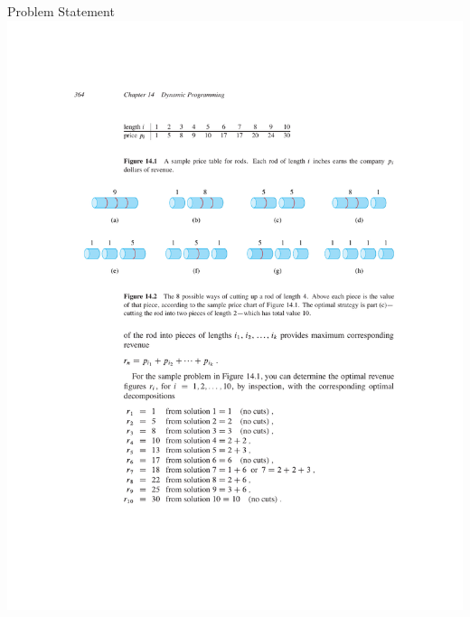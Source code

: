 \documentclass[aspectratio=169]{beamer}
\begin{document}
\begin{frame}{Problem Statement}
    \centering
    \includegraphics[width=\textwidth,clip=true,trim=3cm 13.5cm 3cm 8cm]{figures/p364}
\end{frame}
\end{document}
